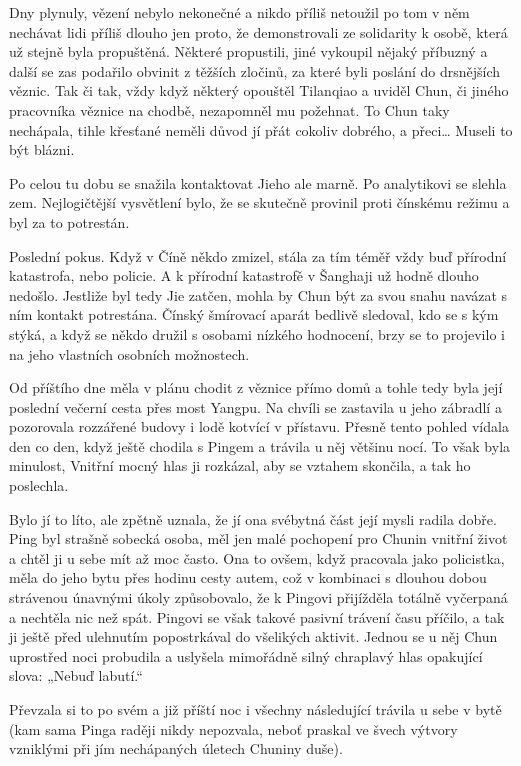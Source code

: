 Dny plynuly, vězení nebylo nekonečné a nikdo příliš netoužil po tom v něm nechávat lidi příliš dlouho jen proto, že demonstrovali ze solidarity k osobě, která už stejně byla propuštěná. Některé propustili, jiné vykoupil nějaký příbuzný a další se zas podařilo obvinit z těžších zločinů, za které byli poslání do drsnějších věznic. Tak či tak, vždy když některý opouštěl Tilanqiao a uviděl Chun, či jiného pracovníka věznice na chodbě, nezapomněl mu požehnat. To Chun taky nechápala, tihle křesťané neměli důvod jí přát cokoliv dobrého, a přeci… Museli to být blázni.

Po celou tu dobu se snažila kontaktovat Jieho ale marně. Po analytikovi se slehla zem. Nejlogičtější vysvětlení bylo, že se skutečně provinil proti čínskému režimu a byl za to potrestán.   
\vspace{0.75cm}

Poslední pokus. Když v Číně někdo zmizel, stála za tím téměř vždy buď přírodní katastrofa, nebo policie. A k přírodní katastrofě v Šanghaji už hodně dlouho nedošlo. Jestliže byl tedy Jie zatčen, mohla by Chun být za svou snahu navázat s ním kontakt potrestána. Čínský šmírovací aparát bedlivě sledoval, kdo se s kým stýká, a když se někdo družil s osobami nízkého hodnocení, brzy se to projevilo i na jeho vlastních osobních možnostech.

Od příštího dne měla v plánu chodit z věznice přímo domů a tohle tedy byla její poslední večerní cesta přes most Yangpu. Na chvíli se zastavila u jeho zábradlí a pozorovala rozzářené budovy i lodě kotvící v přístavu. Přesně tento pohled vídala den co den, když ještě chodila s Pingem a trávila u něj většinu nocí. To však byla minulost, Vnitřní mocný hlas ji rozkázal, aby se vztahem skončila, a tak ho poslechla.

Bylo jí to líto, ale zpětně uznala, že jí ona svébytná část její mysli radila dobře. Ping byl strašně sobecká osoba, měl jen malé pochopení pro Chunin vnitřní život a chtěl ji u sebe mít až moc často. Ona to ovšem, když pracovala jako policistka, měla do jeho bytu přes hodinu cesty autem, což v kombinaci s dlouhou dobou strávenou únavnými úkoly způsobovalo, že k Pingovi přijížděla totálně vyčerpaná a nechtěla nic než spát. Pingovi se však takové pasivní trávení času příčilo, a tak ji ještě před ulehnutím popostrkával do všelikých aktivit. Jednou se u něj Chun uprostřed noci probudila a uslyšela mimořádně silný chraplavý hlas opakující slova: „Nebuď labutí.“

Převzala si to po svém a již příští noc i všechny následující trávila u sebe v bytě (kam sama Pinga raději nikdy nepozvala, neboť praskal ve švech výtvory vzniklými při jím nechápaných úletech Chuniny duše).

